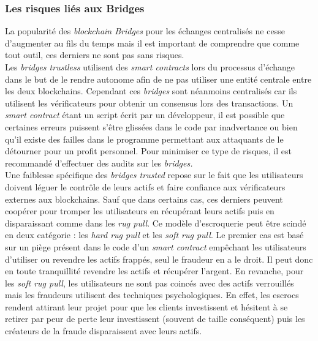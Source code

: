 \subsubsection{Les risques liés aux Bridges}

La popularité des \textit{\gls{blockchain} Bridges} pour les échanges centralisés ne cesse d’augmenter au fils du temps mais il est important de comprendre que comme tout outil, ces derniers ne sont pas sans risques. \\

Les \textit{bridges trustless} utilisent des \textit{\gls{smart contract}s} lors du processus d’échange dans le but de le rendre autonome afin de ne pas utiliser une entité centrale entre les deux \gls{blockchain}s. Cependant ces \textit{bridges} sont néanmoins centralisés car ils utilisent les vérificateurs pour obtenir un consensus lors des transactions.
Un \textit{\gls{smart contract}} étant un script écrit par un développeur, il est possible que certaines erreurs puissent s’être glissées dans le code par inadvertance ou bien qu’il existe des failles dans le programme permettant aux attaquants de le détourner pour un profit personnel. 
Pour minimiser ce type de risques, il est recommandé d’effectuer des audits sur les \textit{bridges.} \\

Une faiblesse spécifique des \textit{bridges trusted} repose sur le fait que les utilisateurs doivent léguer le contrôle de leurs \gls{actif}s et faire confiance aux vérificateurs externes aux \gls{blockchain}s. Sauf que dans certains cas, ces derniers peuvent coopérer pour tromper les utilisateurs en récupérant leurs \gls{actif}s puis en disparaissant comme dans les \textit{rug pull}\cite{EthereumRisks}. Ce modèle d’escroquerie peut être scindé en deux catégorie : les \textit{hard rug pull} et les \textit{soft rug pull}\cite{Hacken}. Le premier cas est basé sur un piège présent dans le code d’un \textit{\gls{smart contract}} empêchant les utilisateurs d’utiliser ou revendre les \gls{actif}s frappés, seul le fraudeur en a le droit. Il peut donc en toute tranquillité revendre les \gls{actif}s et récupérer l’argent. En revanche, pour les \textit{soft rug pull}, les utilisateurs ne sont pas coincés avec des \gls{actif}s verrouillés mais les fraudeurs utilisent des techniques psychologiques. En effet, les escrocs rendent attirant leur projet pour que les clients investissent et hésitent à se retirer par peur de perte leur investissent (souvent de taille conséquent) puis les créateurs de la fraude disparaissent avec leurs \gls{actif}s.\\

